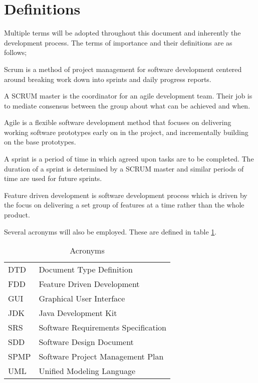 \documentclass{article}
\begin{document}
\section{Definitions}
Multiple terms will be adopted throughout this document and inherently the development process. The terms of importance and their definitions are as follows;
\begin{description}[style=unboxed,leftmargin=0cm]
\item[SCRUM:] Scrum is a method of project management for software development centered around breaking work down into sprints and daily progress reports.
\item[SCRUM Master:] A SCRUM master is the coordinator for an agile development team. Their job is to mediate consensus between the group about what can be achieved and when. 
\item[Agile:] Agile is a flexible software development method that focuses on delivering working software prototypes early on in the project, and incrementally building on the base prototypes.
\item[Sprint:] A sprint is a period of time in which agreed upon tasks are to be completed. The duration of a sprint is determined by a SCRUM master and similar periods of time are used for future sprints.
\item[Feature Driven Development:] Feature driven development is software development process which is driven by the focus on delivering a set group of features at a time rather than the whole product.
\end{description}

Several acronyms will also be employed. These are defined in table \ref{table:acronyms}.

\begin{table}[ht]
\caption{Acronyms \label{table:acronyms}}
  \centering
  \begin{tabular}{|l|l|}
  \hline
  DTD & Document Type Definition \\
  FDD & Feature Driven Development \\
  GUI & Graphical User Interface \\
  JDK & Java Development Kit \\
  SRS & Software Requirements Specification \\
  SDD & Software Design Document \\
  SPMP & Software Project Management Plan \\
  UML & Unified Modeling Language \\
  \hline
  \end{tabular}
\end{table}
\end{document}
